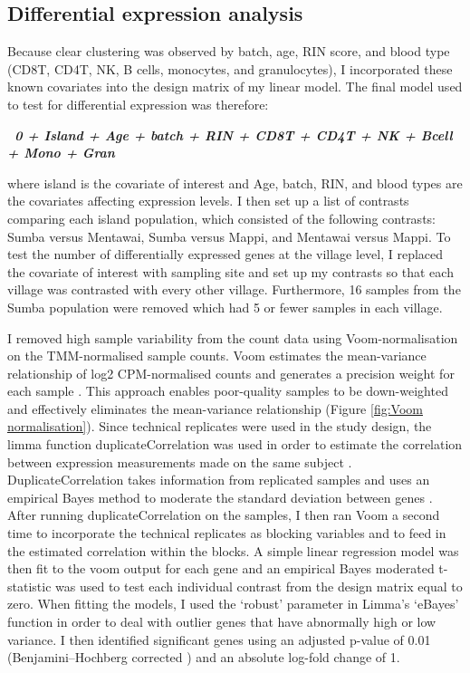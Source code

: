 \documentclass[12pt,a4paper,titlepage,twoside,openright]{book}
\begin{document}
\begin{mainmatter}
{{\section{Differential expression analysis}
Because clear clustering was observed by batch, age, RIN score, and blood type (CD8T, CD4T, NK, B cells, monocytes, and granulocytes), I incorporated these known covariates into the design matrix of my linear model. The final model used to test for differential expression was therefore:

\textbf{\textit{~0 + Island + Age + batch + RIN + CD8T + CD4T + NK + Bcell + Mono + Gran}}

where island is the covariate of interest and Age, batch, RIN, and blood types are the covariates affecting expression levels. I then set up a list of contrasts comparing each island population, which consisted of the following contrasts: Sumba versus Mentawai, Sumba versus Mappi, and Mentawai versus Mappi. To test the number of differentially expressed genes at the village level, I replaced the covariate of interest with sampling site and set up my contrasts so that each village was contrasted with every other village. Furthermore, 16 samples from the Sumba population were removed which had 5 or fewer samples in each village. 
  
I removed high sample variability from the count data using Voom-normalisation on the TMM-normalised sample counts. Voom estimates the mean-variance relationship of log2 CPM-normalised counts and generates a precision weight for each sample \cite{law2014voom}. This approach enables poor-quality samples to be down-weighted and effectively eliminates the mean-variance relationship (﻿Figure \ref{fig:Voom normalisation}). Since technical replicates were used in the study design, the limma function duplicateCorrelation was used in order to estimate the correlation between expression measurements made on the same subject \cite{smyth2003limma}. DuplicateCorrelation takes information from replicated samples and uses an empirical Bayes method to moderate the standard deviation between genes \cite{smyth2003limma}. After running duplicateCorrelation on the samples, I then ran Voom a second time to incorporate the technical replicates as blocking variables and to feed in the estimated correlation within the blocks. A simple linear regression model was then fit to the voom output for each gene and an empirical Bayes moderated t-statistic was used to test each individual contrast from the design matrix equal to zero. When fitting the models, I used the ‘robust’ parameter in Limma’s ‘eBayes’ function in order to deal with outlier genes that have abnormally high or low variance. I then identified significant genes using an adjusted p-value of 0.01 (Benjamini–Hochberg corrected \cite{benjamini1995controlling}) and an absolute log-fold change of 1. 

}}
\end{mainmatter}
\end{document}
